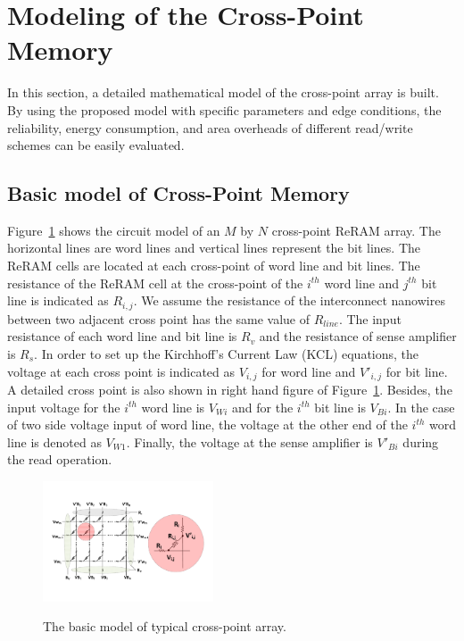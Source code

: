 \section{Modeling of the Cross-Point Memory}\label{sec:model}

In this section, a detailed mathematical model of the cross-point array is built. By using the proposed model with specific parameters and
edge conditions, the reliability, energy consumption, and area overheads of different read/write schemes can be easily evaluated.

\subsection{Basic model of Cross-Point Memory}
Figure~\ref{fig:modeling} shows the circuit model of an $M$ by $N$ cross-point ReRAM array. The horizontal lines are word lines and vertical lines represent the bit lines. The ReRAM cells are located at each cross-point of word line and bit lines. The resistance of the ReRAM cell at the cross-point of the $i^{th}$ word line and $j^{th}$ bit line is indicated as $R_{i,j}$. We assume the resistance of the interconnect nanowires between two adjacent cross point has the same value of $R_{line}$. The input resistance of each word line and bit line is $R_v$ and the resistance of sense amplifier is $R_s$. In order to set up the Kirchhoff's Current Law (KCL) equations, the voltage at each cross point is indicated as $V_{i,j}$ for word line and $V'_{i,j}$ for bit line. A detailed cross point is also shown in right hand figure of Figure~\ref{fig:modeling}. Besides, the input voltage for the $i^{th}$ word line is $V_{Wi}$ and for the $i^{th}$ bit line is $V_{Bi}$. In the case of two side voltage input of word line, the voltage at the other end of the $i^{th}$ word line is denoted as $V_{W1}$. Finally, the voltage at the sense amplifier is $V'_{Bi}$ during the read operation.

\begin{figure}%
\centering
  \includegraphics[width=0.45\textwidth]{./figures/model_reverse.pdf}\\
  \caption{The basic model of typical cross-point array.}\label{fig:modeling}
  \vspace{-12pt}
\end{figure}

